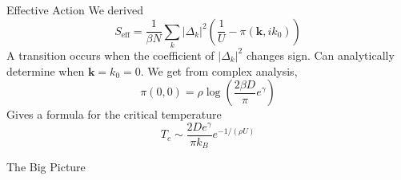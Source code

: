 \documentclass[aspectratio=169,xcolor=dvipsnames]{beamer}
\begin{document}
\begin{frame}{Effective Action}
    We derived 
    \begin{equation*}
        S_\text{eff} = \frac{1}{\beta N}\sum_k |\Delta_k|^2\left(\frac{1}{U} - \pi(\bm{k},ik_0)\right)
    \end{equation*}
    A transition occurs when the coefficient of $|\Delta_k|^2$ changes sign. Can analytically determine when $\bm{k}=k_0=0.$ We get from complex analysis, 
    \begin{equation*}
        \pi(0,0) = \rho \log\left(\frac{2\beta D}{\pi}e^\gamma\right)
    \end{equation*}
    Gives a formula for the critical temperature
    \begin{equation*}
        \boxed{T_c \sim \frac{2De^\gamma}{\pi k_B}e^{-1/({\rho}U)}}
    \end{equation*}
\end{frame}
\begin{frame}{The Big Picture}
    \begin{center}
    \end{center}
\end{frame}
\end{document}
